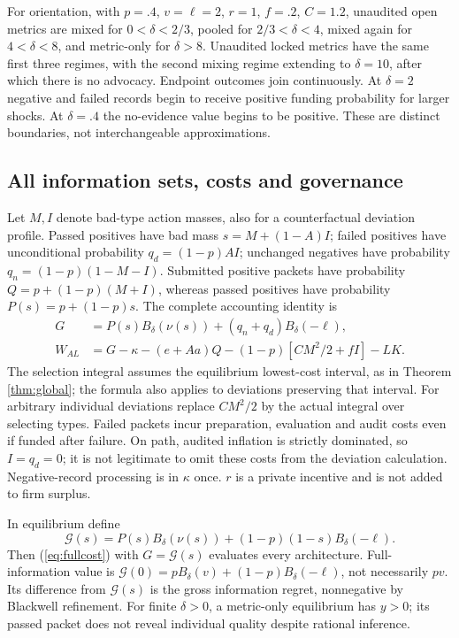\documentclass[11pt]{article}
\begin{document}
For orientation, with $p=.4$, $v=\ell=2$, $r=1$, $f=.2$, $C=1.2$, unaudited open metrics are mixed for $0<\delta<2/3$, pooled for $2/3<\delta<4$, mixed again for $4<\delta<8$, and metric-only for $\delta>8$. Unaudited locked metrics have the same first three regimes, with the second mixing regime extending to $\delta=10$, after which there is no advocacy. Endpoint outcomes join continuously. At $\delta=2$ negative and failed records begin to receive positive funding probability for larger shocks. At $\delta=.4$ the no-evidence value begins to be positive. These are distinct boundaries, not interchangeable approximations.

\subsection{All information sets, costs and governance}\label{subsec:globalcost}
Let $M,I$ denote bad-type action masses, also for a counterfactual deviation profile. Passed positives have bad mass $s=M+(1-A)I$; failed positives have unconditional probability $q_d=(1-p)AI$; unchanged negatives have probability $q_n=(1-p)(1-M-I)$. Submitted positive packets have probability $Q=p+(1-p)(M+I)$, whereas passed positives have probability $P(s)=p+(1-p)s$. The complete accounting identity is
\begin{align}
G&=P(s)B_\delta(\nu(s))+(q_n+q_d)B_\delta(-\ell),\label{eq:allsets}\\
W_{AL}&=G-\kappa-(e+Aa)Q-(1-p)[CM^2/2+fI]-LK.\label{eq:fullcost}
\end{align}
The selection integral assumes the equilibrium lowest-cost interval, as in Theorem \ref{thm:global}; the formula also applies to deviations preserving that interval. For arbitrary individual deviations replace $CM^2/2$ by the actual integral over selecting types. Failed packets incur preparation, evaluation and audit costs even if funded after failure. On path, audited inflation is strictly dominated, so $I=q_d=0$; it is not legitimate to omit these costs from the deviation calculation. Negative-record processing is in $\kappa$ once. $r$ is a private incentive and is not added to firm surplus.

In equilibrium define
\begin{equation}\mathcal G(s)=P(s)B_\delta(\nu(s))+(1-p)(1-s)B_\delta(-\ell).\label{eq:gfull}
\end{equation}
Then (\ref{eq:fullcost}) with $G=\mathcal G(s)$ evaluates every architecture. Full-information value is $\mathcal G(0)=pB_\delta(v)+(1-p)B_\delta(-\ell)$, not necessarily $pv$. Its difference from $\mathcal G(s)$ is the gross information regret, nonnegative by Blackwell refinement. For finite $\delta>0$, a metric-only equilibrium has $y>0$; its passed packet does not reveal individual quality despite rational inference.
\end{document}
